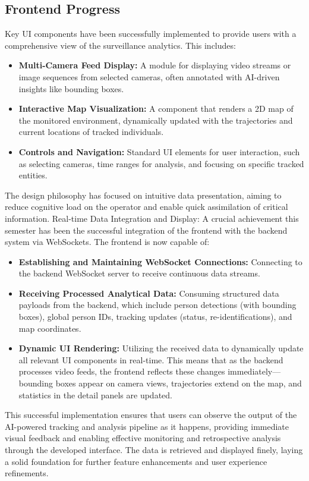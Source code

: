 \subsection*{Frontend Progress}
\label{subsec:progress_frontend}
Key UI components have been successfully implemented to provide users with a comprehensive view of the surveillance analytics. This includes:
\begin{itemize}
    \item \textbf{Multi-Camera Feed Display:} A module for displaying video streams or image sequences from selected cameras, often annotated with AI-driven insights like bounding boxes.
    \item \textbf{Interactive Map Visualization:} A component that renders a 2D map of the monitored environment, dynamically updated with the trajectories and current locations of tracked individuals.
    \item \textbf{Controls and Navigation:}  Standard UI elements for user interaction, such as selecting cameras, time ranges for analysis, and focusing on specific tracked entities.
\end{itemize}
The design philosophy has focused on intuitive data presentation, aiming to reduce cognitive load on the operator and enable quick assimilation of critical information.
Real-time Data Integration and Display:
A crucial achievement this semester has been the successful integration of the frontend with the backend system via WebSockets. The frontend is now capable of:
\begin{itemize}
    \item \textbf{Establishing and Maintaining WebSocket Connections:} Connecting to the backend WebSocket server to receive continuous data streams.
    \item \textbf{Receiving Processed Analytical Data:} Consuming structured data payloads from the backend, which include person detections (with bounding boxes), global person IDs, tracking updates (status, re-identifications), and map coordinates.
    \item \textbf{Dynamic UI Rendering:} Utilizing the received data to dynamically update all relevant UI components in real-time. This means that as the backend processes video feeds, the frontend reflects these changes immediately—bounding boxes appear on camera views, trajectories extend on the map, and statistics in the detail panels are updated.
\end{itemize}
This successful implementation ensures that users can observe the output of the AI-powered tracking and analysis pipeline as it happens, providing immediate visual feedback and enabling effective monitoring and retrospective analysis through the developed interface. The data is retrieved and displayed finely, laying a solid foundation for further feature enhancements and user experience refinements.
